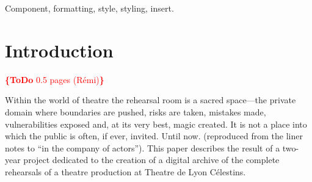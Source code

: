 \documentclass[conference]{IEEEtran}
\newcommand{\todo}[1]{\noindent\textcolor{red}{{\bf \{ToDo} #1{\bf \}}}}
\begin{document}




\maketitle


\begin{abstract}
\todo{BLA BLA BLA}
\end{abstract}


\begin{keywords}
Component, formatting, style, styling, insert.
\end{keywords}

%
\IEEEpeerreviewmaketitle



\section{Introduction}

\todo{0.5 pages (Rémi)}

Within the world of theatre the rehearsal room is a sacred space---the private domain where boundaries are pushed, risks are taken, mistakes made, vulnerabilities exposed and, at its very best, magic created. It is not a place into which the public is often, if ever, invited. Until now. (reproduced from the liner notes to ``in the company of actors''). This paper describes the result of a two-year project dedicated to the creation of a digital archive  of  the complete  rehearsals of a theatre production at Theatre de Lyon Célestins.
\end{document}
